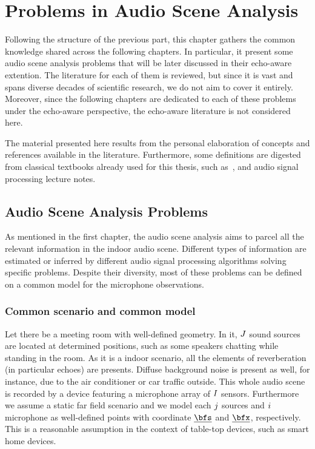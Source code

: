 \chapter{Problems in Audio Scene Analysis}\label{ch:application}

 \synopsisChApplication

\mynewline
Following the structure of the previous part, this chapter gathers the common knowledge shared across the following chapters.
In particular, it present some audio scene analysis problems that will be later discussed in their echo-aware extention.
The literature for each of them is reviewed, but since it is vast and spans diverse decades of scientific research, we do not aim to cover it entirely.
Moreover, since the following chapters are dedicated to each of these problems under the echo-aware perspective, the echo-aware literature is not considered here.

\mynewline
The material presented here results from the personal elaboration of concepts and references available in the literature.
Furthermore, some definitions are digested from classical textbooks already used for this thesis, such as~, and audio signal processing lecture notes.

\section{Audio Scene Analysis Problems}\label{sec:application:scenario}
As mentioned in the first chapter, the audio scene analysis aims to parcel all the relevant information in the indoor audio scene.
Different types of information are estimated or inferred by different audio signal processing algorithms solving specific problems.
Despite their diversity, most of these problems can be defined on a common model for the microphone observations.

\subsection{Common scenario and common model}
Let there be a meeting room with well-defined geometry.
In it, $J$ sound sources are located at determined positions, such as some speakers chatting while standing in the room.
As it is a indoor scenario, all the elements of reverberation (in particular echoes) are presents.
Diffuse background noise is present as well, for instance, due to the air conditioner or car traffic outside.
This whole audio scene is recorded by a device featuring a microphone array of $I$ sensors.
Furthermore we assume a static far field scenario and we model each $j$ sources and $i$ microphone as well-defined points with coordinate $\positionSource$ and $\positionMicrophone$, respectively.
This is a reasonable assumption in the context of table-top devices, such as smart home devices.

